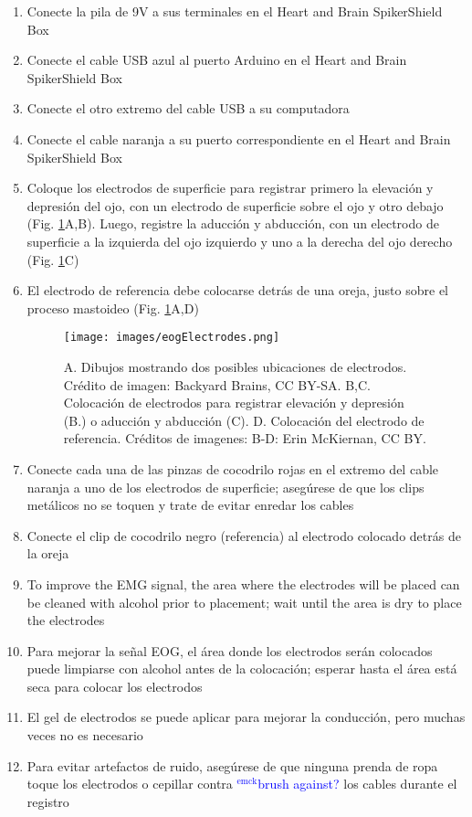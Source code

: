 \documentclass[12pt]{article}
\newcommand{\emck}[1]{\textcolor{blue}{$^{\textrm{emck}}${#1}}}
\begin{document}
\begin{enumerate}
\item Conecte la pila de 9V a sus terminales en el Heart and Brain
  SpikerShield Box
\item Conecte el cable USB azul al puerto Arduino en el Heart and
  Brain SpikerShield Box
\item Conecte el otro extremo del cable USB a su computadora
\item Conecte el cable naranja a su puerto correspondiente en el Heart
  and Brain SpikerShield Box
\item Coloque los electrodos de superficie para registrar primero la
  elevación y depresión del ojo, con un electrodo de superficie sobre
  el ojo y otro debajo (Fig. \ref{fig:ePlacement}A,B). Luego, registre
  la aducción y abducción, con un electrodo de superficie a la
  izquierda del ojo izquierdo y uno a la derecha del ojo derecho
  (Fig. \ref{fig:ePlacement}C)
\item El electrodo de referencia debe colocarse detrás de una oreja,
  justo sobre el proceso mastoideo (Fig. \ref{fig:ePlacement}A,D)

\vspace{0.2cm}

\begin{figure}[h!]
\centering
\texttt{[image: images/eogElectrodes.png]}
\caption{A. Dibujos mostrando dos posibles ubicaciones de
  electrodos. Crédito de imagen: Backyard Brains, CC
  BY-SA. B,C. Colocación de electrodos para registrar elevación y
  depresión (B.) o aducción y abducción (C). D. Colocación del
  electrodo de referencia. Créditos de imagenes: B-D: Erin McKiernan,
  CC BY.}
\label{fig:ePlacement}
\end{figure}

\item Conecte cada una de las pinzas de cocodrilo rojas en el extremo del
  cable naranja a uno de los electrodos de superficie; asegúrese de
  que los clips metálicos no se toquen y trate de evitar enredar los
  cables
\item Conecte el clip de cocodrilo negro (referencia) al electrodo
  colocado detrás de la oreja
\item To improve the EMG signal, the area where the electrodes will be
  placed can be cleaned with alcohol prior to placement; wait until
  the area is dry to place the electrodes
\item Para mejorar la señal EOG, el área donde los electrodos serán
  colocados puede limpiarse con alcohol antes de la colocación; esperar
  hasta el área está seca para colocar los electrodos
\item El gel de electrodos se puede aplicar para mejorar la
  conducción, pero muchas veces no es necesario
\item Para evitar artefactos de ruido, asegúrese de que ninguna prenda
  de ropa toque los electrodos o cepillar contra \emck{brush against?}
  los cables durante el registro
\end{enumerate}
\end{document}
